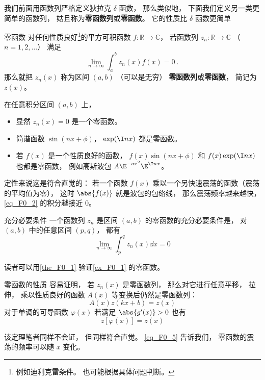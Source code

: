 
我们前面用函数列严格定义狄拉克 $\delta$ 函数， 那么类似地， 下面我们定义另一类更简单的函数列， 姑且称为\textbf{零函数列}或\textbf{零函数}。 它的性质比 $\delta$ 函数更简单
\begin{definition}{零函数}
对任何性质良好\footnote{例如迪利克雷条件。 也可能根据具体问题判断。}的平方可积函数 $f: \mathbb R \to \mathbb C$， 若函数列 $z_n: \mathbb R \to \mathbb C$ （$n = 1, 2, \dots$） 满足
\begin{equation}\label{eq_F0_2}
\lim_{n\to \infty}\int_{a}^{b} z_n(x) f(x) = 0~.
\end{equation}
那么就把 $z_n(x)$ 称为区间 $(a,b)$ （可以是无穷） \textbf{零函数列}或\textbf{零函数}， 简记为 $z(x)$。
\end{definition}

\begin{example}{}\label{ex_F0_1}
在任意积分区间 $(a,b)$ 上，
\begin{itemize}
\item 显然 $z_n(x) = 0$ 是一个零函数。
\item 简谐函数 $\sin(nx + \phi)$， $\exp(\I n x)$ 都是零函数。
\item 若 $f(x)$ 是一个性质良好的函数， $f(x)\sin(nx + \phi)$ 和 $f(x)\exp(\I n x)$ 也都是零函数， 例如高斯波包 $A\E^{-ax^2}\E^{\I nx}$。
\end{itemize}

定性来说这是符合直觉的： 若一个函数 $f(x)$ 乘以一个另快速震荡的函数（震荡的平均值为零）， 这时 $\abs{f(x)}$ 就是波包的包络线， 那么震荡频率越来越快， \autoref{eq_F0_2} 的积分越接近 $0$。
\end{example}

\begin{theorem}{充分必要条件}\label{the_F0_1}
一个函数列 $z_n$ 是区间 $(a, b)$ 的零函数的充分必要条件是， 对 $(a, b)$ 中的任意区间 $(p, q)$， 都有
\begin{equation}
\lim_{n\to\infty}\int_p^q z_n(x) \dd{x} = 0
\end{equation}
\end{theorem}
读者可以用\autoref{the_F0_1} 验证\autoref{ex_F0_1} 的零函数。

\begin{theorem}{零函数的性质}
容易证明， 若 $z_n(x)$ 是零函数列， 那么对它进行任意平移， 拉伸， 乘以性质良好的函数 $A(x)$ 等变换后仍然是零函数列：
\begin{equation}
A(x) z(kx + b) = z(x)
\end{equation}
对于单调的可导函数 $\varphi(x)$ 若满足 $\abs{g'(x)} > 0$ 也有
\begin{equation}\label{eq_F0_5}
z[\varphi(x)] = z(x)
\end{equation}
\end{theorem}
该定理笔者同样不会证， 但同样符合直觉。 \autoref{eq_F0_5} 告诉我们， 零函数的震荡的频率可以随 $x$ 变化。

